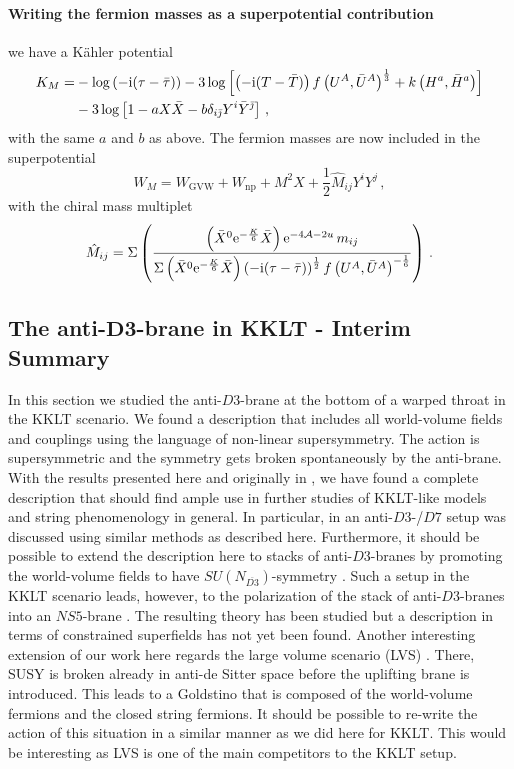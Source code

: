 \documentclass[a4paper,12pt,twoside,openright]{report}
\newcommand{\be}{\begin{equation}}
\newcommand{\ee}{\end{equation}}
\newcommand{\bea}{\begin{equation}\begin{aligned}}
\newcommand{\eea}{\end{aligned}\end{equation}}
\def\rmi{{\rm i}}
\def\rme{{\rm e}}
\def\jb{{\bar \jmath}}
\begin{document}
\paragraph{Writing the fermion masses as a superpotential  contribution} we have a Kähler potential
\bea 
K_M = & - \log \left(-\rmi (\tau-\bar{\tau})\right) - 3 \log \left[ \left(-\rmi (T-\bar{T})\right) f\left(U^A,\bar{U}^A \right)^{\frac{1}{3}}+k\left(H^a,\bar{H}^a\right)\right]\\
 & - 3 \log \left[1-a X \bar{X} - b \delta_{i\jb}Y^i \bar{Y}^\jb \right]\,,
 \label{eq:D3barKMfinal}
 \eea
 with the same $a$ and $b$ as above. The fermion masses are now included in the superpotential 
 \be
 W_M = W_{\text{GVW}} + W_{\text{np}} + M^2 X + \frac{1}{2} \hat{M}_{ij} Y^i Y^j\,,
 \label{eq:D3barWMfinal}
 \ee
with the chiral mass multiplet
\be 
\hat{M}_{ij} = \Sigma \left(\frac{\left(\bar{X}^0 \rme^{-\frac{K}{6}}\bar{X}\right)\rme^{-4\mathcal{A}-2u}\,m_{ij}}{\Sigma\left(\bar{X}^0 \rme^{-\frac{K}{6}}\bar{X}\right)\left(-\rmi (\tau-\bar{\tau})\right)^{\frac{1}{2}}f\left(U^A,\bar{U}^A\right)^{-\frac{1}{6}}}\right)\,.
\label{eq:D3barmassmultfinal}
\ee

\subsection[The anti-$D3$-brane in KKLT - Interim Summary]{The anti-$\mathbf{D3}$-brane in KKLT - Interim Summary}
In this section we studied the anti-$D3$-brane at the bottom of a warped throat in the KKLT scenario. We found a description that includes all world-volume fields and couplings using the language of non-linear supersymmetry. The action is supersymmetric and the symmetry gets broken spontaneously by the anti-brane. With the results presented here and originally in \cite{Cribiori:2019hod}, we have found a complete description that should find ample use in further studies of KKLT-like models and string phenomenology in general. In particular, in \cite{Parameswaran:2020ukp} an anti-$D3$-/$D7$ setup was discussed using similar methods as described here. Furthermore, it should be possible to extend the description here to stacks of anti-$D3$-branes by promoting the world-volume fields to have $SU(N_{\overline{D3}})$-symmetry \cite{McGuirk:2012sb}. Such a setup in the KKLT scenario leads, however, to the polarization of the stack of anti-$D3$-branes into an $NS5$-brane \cite{Kachru:2002gs}. The resulting theory \cite{Aalsma:2017ulu,Aalsma:2018pll} has been studied but a description in terms of constrained superfields has not yet been found. Another interesting extension of our work here regards the large volume scenario (LVS) \cite{Balasubramanian:2005zx,Conlon:2005ki}. There, SUSY is broken already in anti-de Sitter space before the uplifting brane is introduced. This leads to a Goldstino that is composed of the world-volume fermions and the closed string fermions. It should be possible to re-write the action of this situation in a similar manner as we did here for KKLT. This would be interesting as LVS is one of the main competitors to the KKLT setup.
\end{document}
